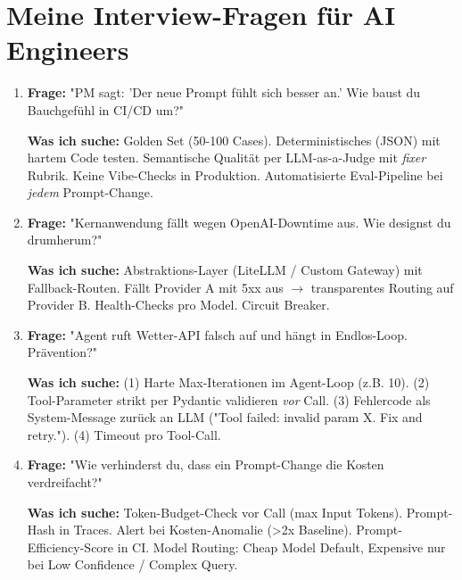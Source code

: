 \section{Meine Interview-Fragen für AI Engineers}

\begin{enumerate}[leftmargin=*]
    \item \textbf{Frage:} "PM sagt: 'Der neue Prompt fühlt sich besser an.' Wie baust du Bauchgefühl in CI/CD um?"
    
    \textbf{Was ich suche:} Golden Set (50-100 Cases). Deterministisches (JSON) mit hartem Code testen. Semantische Qualität per LLM-as-a-Judge mit \textit{fixer} Rubrik. Keine Vibe-Checks in Produktion. Automatisierte Eval-Pipeline bei \textit{jedem} Prompt-Change.
    
    \item \textbf{Frage:} "Kernanwendung fällt wegen OpenAI-Downtime aus. Wie designst du drumherum?"
    
    \textbf{Was ich suche:} Abstraktions-Layer (LiteLLM / Custom Gateway) mit Fallback-Routen. Fällt Provider A mit 5xx aus $\rightarrow$ transparentes Routing auf Provider B. Health-Checks pro Model. Circuit Breaker.
    
    \item \textbf{Frage:} "Agent ruft Wetter-API falsch auf und hängt in Endlos-Loop. Prävention?"
    
    \textbf{Was ich suche:} (1) Harte Max-Iterationen im Agent-Loop (z.B. 10). (2) Tool-Parameter strikt per Pydantic validieren \textit{vor} Call. (3) Fehlercode als System-Message zurück an LLM ("Tool failed: invalid param X. Fix and retry."). (4) Timeout pro Tool-Call.
    
    \item \textbf{Frage:} "Wie verhinderst du, dass ein Prompt-Change die Kosten verdreifacht?"
    
    \textbf{Was ich suche:} Token-Budget-Check vor Call (max Input Tokens). Prompt-Hash in Traces. Alert bei Kosten-Anomalie (>2x Baseline). Prompt-Efficiency-Score in CI. Model Routing: Cheap Model Default, Expensive nur bei Low Confidence / Complex Query.
\end{enumerate}

